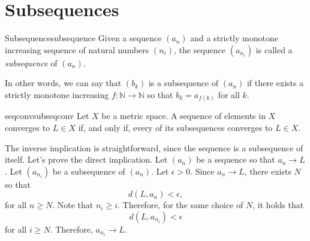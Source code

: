 \section{Subsequences}


\begin{defn}{Subsequence}{subsequence}
	Given a sequence \((a_n)\) and a strictly monotone increasing sequence of natural numbers \((n_i)\), the sequence \((a_{n_i})\) is called a \emph{subsequence} of  \((a_n)\).

In other words, we can say that \((b_k)\) is a subsequence of \((a_n)\) if there exists a strictly monotone increasing \(f: \mathbb{N} \to \mathbb{N}\) so that \(b_k = a_{f(k)}\) for all \(k\).
\end{defn}

\begin{thm}{}{seqconvsubseqconv}
	Let \(X\) be a metric space.
	A sequence of elements in \(X\) converges to \(L \in X\) if, and only if, every of its subsequences converges to \(L \in X\).
\end{thm}

\begin{dem}{}{}
	The inverse implication is straightforward, since the sequence is a subsequence of itself. Let's prove the direct implication.
	Let \((a_n)\) be a sequence so that \(a_n \to L\). Let \((a_{n_i})\) be a subsequence of \((a_n)\).
	Let \(\epsilon > 0\). Since \(a_n \to L\), there exists \(N\) so that \[
		d(L, a_n) < \epsilon,
	\] for all \(n \geq N\). Note that \(n_i \geq i\). Therefore, for the same choice of \(N\), it holds that \[
		d(L, a_{n_i}) < \epsilon
	\] for all \(i \geq N\).
	Therefore,  \(a_{n_i} \to L\).
\end{dem}
